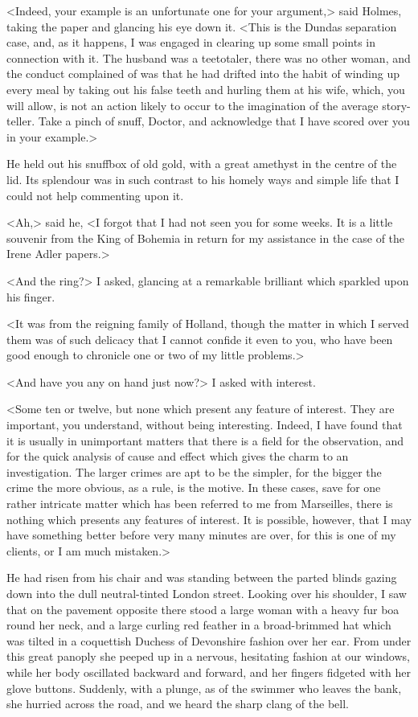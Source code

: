 <Indeed, your example is an unfortunate one for your argument,> said Holmes, taking the paper and glancing his eye down it. <This is the Dundas separation case, and, as it happens, I was engaged in clearing up some small points in connection with it. The husband was a teetotaler, there was no other woman, and the conduct complained of was that he had drifted into the habit of winding up every meal by taking out his false teeth and hurling them at his wife, which, you will allow, is not an action likely to occur to the imagination of the average story-teller. Take a pinch of snuff, Doctor, and acknowledge that I have scored over you in your example.>

He held out his snuffbox of old gold, with a great amethyst in the centre of the lid. Its splendour was in such contrast to his homely ways and simple life that I could not help commenting upon it.

<Ah,> said he, <I forgot that I had not seen you for some weeks. It is a little souvenir from the King of Bohemia in return for my assistance in the case of the Irene Adler papers.>

<And the ring?> I asked, glancing at a remarkable brilliant which sparkled upon his finger.

<It was from the reigning family of Holland, though the matter in which I served them was of such delicacy that I cannot confide it even to you, who have been good enough to chronicle one or two of my little problems.>

<And have you any on hand just now?> I asked with interest.

<Some ten or twelve, but none which present any feature of interest. They are important, you understand, without being interesting. Indeed, I have found that it is usually in unimportant matters that there is a field for the observation, and for the quick analysis of cause and effect which gives the charm to an investigation. The larger crimes are apt to be the simpler, for the bigger the crime the more obvious, as a rule, is the motive. In these cases, save for one rather intricate matter which has been referred to me from Marseilles, there is nothing which presents any features of interest. It is possible, however, that I may have something better before very many minutes are over, for this is one of my clients, or I am much mistaken.>

He had risen from his chair and was standing between the parted blinds gazing down into the dull neutral-tinted London street. Looking over his shoulder, I saw that on the pavement opposite there stood a large woman with a heavy fur boa round her neck, and a large curling red feather in a broad-brimmed hat which was tilted in a coquettish Duchess of Devonshire fashion over her ear. From under this great panoply she peeped up in a nervous, hesitating fashion at our windows, while her body oscillated backward and forward, and her fingers fidgeted with her glove buttons. Suddenly, with a plunge, as of the swimmer who leaves the bank, she hurried across the road, and we heard the sharp clang of the bell.

